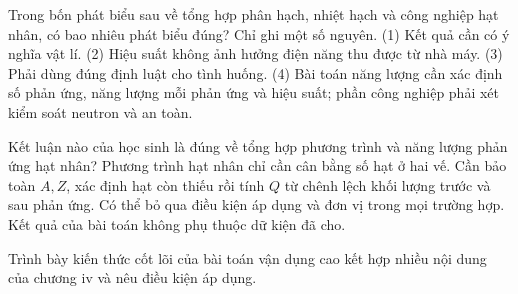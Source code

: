 \begin{ex}
Trong bốn phát biểu sau về tổng hợp phân hạch, nhiệt hạch và công nghiệp hạt nhân, có bao nhiêu phát biểu đúng? Chỉ ghi một số nguyên. (1) Kết quả cần có ý nghĩa vật lí. (2) Hiệu suất không ảnh hưởng điện năng thu được từ nhà máy. (3) Phải dùng đúng định luật cho tình huống. (4) Bài toán năng lượng cần xác định số phản ứng, năng lượng mỗi phản ứng và hiệu suất; phần công nghiệp phải xét kiểm soát neutron và an toàn.
\end{ex}

\begin{ex}
Kết luận nào của học sinh là đúng về tổng hợp phương trình và năng lượng phản ứng hạt nhân?
\choice
{Phương trình hạt nhân chỉ cần cân bằng số hạt ở hai vế.}
{\True Cần bảo toàn $A,Z$, xác định hạt còn thiếu rồi tính $Q$ từ chênh lệch khối lượng trước và sau phản ứng.}
{Có thể bỏ qua điều kiện áp dụng và đơn vị trong mọi trường hợp.}
{Kết quả của bài toán không phụ thuộc dữ kiện đã cho.}
\end{ex}

\begin{bt}
Trình bày kiến thức cốt lõi của bài toán vận dụng cao kết hợp nhiều nội dung của chương iv và nêu điều kiện áp dụng.
\end{bt}

